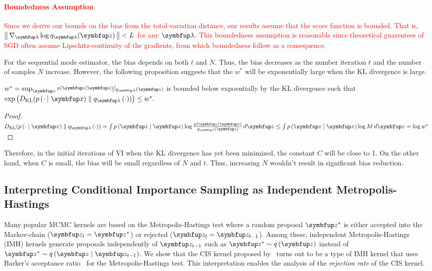 \textcolor{red}{
  \paragraph{Boundedness Assumption}
Since we derive our bounds on the bias from the total-variation distance, our results assume that the score function is bounded.
That is, \(\norm{\nabla_{\vlambda} \log q_{\vlambda}(\vz)} < L\) for any \(\vlambda\).
This boundedness assumption is reasonable since theoretical guarentees of SGD often assume Lipschitz-continuity of the gradients, from which boundedness follow as a consequence.
}


%
For the sequential mode estimator, the bias depends on both \(t\) and \(N\).
Thus, the bias decreases as the number iteration \(t\) and the number of samples \(N\) increase.
However, the following proposition suggests that the \(w^*\) will be exponentially large when the KL divergence is large.
%
\begin{proposition}
  \(w^* = \sup_{\vz} \nicefrac{p\left(\vz\mid\vx\right)}{q_{\vlambda}\left(\vz\right)} \) is bounded below expoentially by the KL divergence such that
  \(
  \exp\left(\DKL{p\left(\cdot\mid\vx\right)}{ q_{\vlambda}\left(\cdot\right) }\right) \leq w^*.
  \)
  \begin{proof}
    \(
    \DKL{p\left(\cdot\mid\vx\right)}{ q_{\vlambda}\left(\cdot\right) }
    = \int p\left(\vz\mid\vx\right) \log \frac{p\left(\vz\mid\vx\right)}{q_{\vlambda}\left(\vz\right)}\,d\vz
    \leq \int p\left(\vz\mid\vx\right) \log M \, d\vz = \log w^*
    \)
  \end{proof}
\end{proposition}
%
Therefore, in the initial iterations of VI when the KL divergence has yet been minimized, the constant \(C\) will be close to 1.
On the other hand, when \(C\) is small, the bias will be small regardless of \(N\) and \(t\).
Thus, increasing \(N\) wouldn't result in significant bias reduction.




\subsection{Interpreting Conditional Importance Sampling as Independent Metropolis-Hastings}\label{section:cis_imh}
Many popular MCMC kernels are based on the Metropolis-Hastings test where a random proposal \(\vz^*\) is either accepted into the Markov-chain (\(\vz_{t} = \vz^*\)) or rejected (\(\vz_t = \vz_{t-1}\)).
Among these, independent Metropolis-Hastings (IMH) kernels generate proposals independently of \(\vz_{t-1}\) such as \(\vz^* \sim q\,(\vz)\) instead of \(\vz^* \sim q\,(\vz\mid\vz_{t-1})\).%
We show that the CIS kernel proposed by~\citet{NEURIPS2020_b2070693} turns out to be a type of IMH kernel that uses Barker's acceptance ratio~\citep{barker_monte_1965} for the Metropolis-Hastings test.
This interpretation enables the analysis of the \textit{rejection rate} of the CIS kernel.

